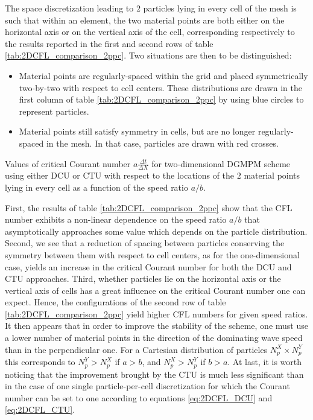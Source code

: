 The space discretization leading to $2$ particles lying in every cell of the mesh is such that within an element, the two material points are both either on the horizontal axis or on the vertical axis of the cell, corresponding respectively to the results reported in the first and second rows of table \ref{tab:2DCFL_comparison_2ppc}.
Two situations are then to be distinguished:
\begin{itemize}
\item Material points are regularly-spaced within the grid and placed symmetrically two-by-two with respect to cell centers.
  These distributions are drawn in the first column of table \ref{tab:2DCFL_comparison_2ppc} by using blue circles to represent particles.
\item Material points still satisfy symmetry in cells, but are no longer regularly-spaced in the mesh. In that case, particles are drawn with red crosses.
\end{itemize}
\begin{table}[h]
  \centering
  
  \caption{Values of critical Courant number $a\frac{\Delta t}{\Delta X}$ for two-dimensional DGMPM scheme using either DCU or CTU with respect to the locations of the $2$ material points lying in every cell as a function of the speed ratio $a/b$.}
  \label{tab:2DCFL_comparison_2ppc}
\end{table}
First, the results of table \ref{tab:2DCFL_comparison_2ppc} show that the CFL number exhibits a non-linear dependence on the speed ratio $a/b$ that asymptotically approaches some value which depends on the particle distribution.
Second, we see that a reduction of spacing between particles conserving the symmetry between them with respect to cell centers, as for the one-dimensional case, yields an increase in the critical Courant number for both the DCU and CTU approaches. 
Third, whether particles lie on the horizontal axis or the vertical axis of cells has a great influence on the critical Courant number one can expect.
Hence, the configurations of the second row of table \ref{tab:2DCFL_comparison_2ppc} yield higher CFL numbers for given speed ratios.
It then appears that in order to improve the stability of the scheme, one must use a lower number of material points in the direction of the dominating wave speed than in the perpendicular one. For a Cartesian distribution of particles $N_p^X \times N_p^Y$ this corresponds to $N_p^Y > N_p^X$ if $a>b$, and $N_p^X > N_p^Y$ if $b>a$.
At last, it is worth noticing that the improvement brought by the CTU is much less significant than in the case of one single particle-per-cell discretization for which the Courant number can be set to one according to equations \eqref{eq:2DCFL_DCU} and \eqref{eq:2DCFL_CTU}.

